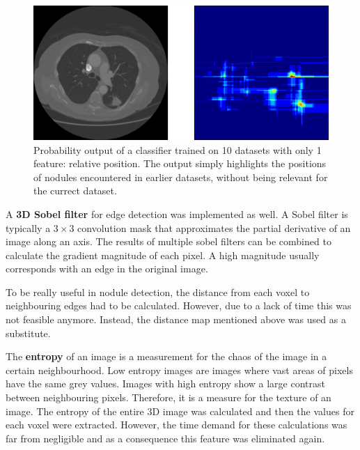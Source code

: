 \begin{figure}[ht]
\begin{center}
  \includegraphics[width=\linewidth]{img/RelPositionFeature.png}
  \caption[]{Probability output of a classifier trained on 10 datasets with only
  1 feature: relative position. The output simply highlights the positions of
  nodules encountered in earlier datasets, without being relevant for the
  currect dataset.}
  \label{fig:posFeature}
\end{center}
\end{figure}

A \textbf{3D Sobel filter} for edge detection was implemented as well. A Sobel
filter is typically a $3 \times 3$ convolution mask that approximates the
partial derivative of an image along an axis. The results of multiple sobel
filters can be combined to calculate the gradient magnitude of each pixel. A
high magnitude usually corresponds with an edge in the original image.

To be really useful in nodule detection, the distance from each voxel to
neighbouring edges had to be calculated. However, due to a lack of time this was
not feasible anymore. Instead, the distance map mentioned above was used as a
substitute.

The \textbf{entropy} of an image is a measurement for the chaos of the image in a
certain neighbourhood. Low entropy images are images where vast areas of pixels
have the same grey values. Images with high entropy show a large contrast
between neighbouring pixels. Therefore, it is a measure for the texture of an
image. The entropy of the entire 3D image was calculated and then the values for
each voxel were extracted. However, the time demand for these calculations was
far from negligible and as a consequence this feature was eliminated again.


